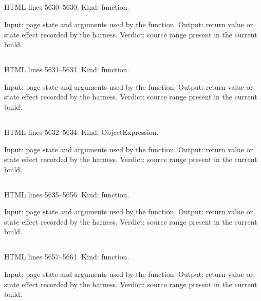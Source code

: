 \subsection*{\texttt{}}
\label{vf_252_currentTab}
HTML lines 5630--5630. Kind: function.

Input: page state and arguments used by the function.
Output: return value or state effect recorded by the harness.
Verdict: source range present in the current build.

\subsection*{\texttt{}}
\label{vf_253_currentReviewSheet}
HTML lines 5631--5631. Kind: function.

Input: page state and arguments used by the function.
Output: return value or state effect recorded by the harness.
Verdict: source range present in the current build.

\subsection*{\texttt{}}
\label{vf_254_REVIEW_RENDERERS}
HTML lines 5632--5634. Kind: ObjectExpression.

Input: page state and arguments used by the function.
Output: return value or state effect recorded by the harness.
Verdict: source range present in the current build.

\subsection*{\texttt{}}
\label{vf_255_renderTab}
HTML lines 5635--5656. Kind: function.

Input: page state and arguments used by the function.
Output: return value or state effect recorded by the harness.
Verdict: source range present in the current build.

\subsection*{\texttt{}}
\label{vf_256_renderReviewSheetLazy}
HTML lines 5657--5661. Kind: function.

Input: page state and arguments used by the function.
Output: return value or state effect recorded by the harness.
Verdict: source range present in the current build.

